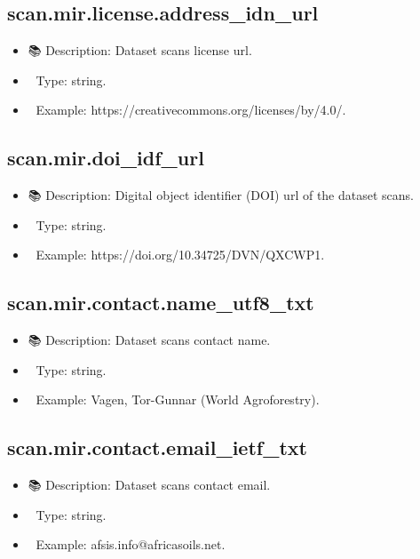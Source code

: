 \documentclass[
  letterpaper,
  DIV=11,
  numbers=noendperiod]{scrreprt}
\providecommand{\tightlist}{%
  \setlength{\itemsep}{0pt}\setlength{\parskip}{0pt}}\usepackage{longtable,booktabs,array}
\begin{document}
\subsection{scan.mir.license.address\_idn\_url}\label{scan.mir.license.address_idn_url}

\begin{itemize}
\tightlist
\item
  📚 Description: Dataset scans license url.
\item
  🔢 Type: string.
\item
  📖 Example: https://creativecommons.org/licenses/by/4.0/.
\end{itemize}

\subsection{scan.mir.doi\_idf\_url}\label{scan.mir.doi_idf_url}

\begin{itemize}
\tightlist
\item
  📚 Description: Digital object identifier (DOI) url of the dataset
  scans.
\item
  🔢 Type: string.
\item
  📖 Example: https://doi.org/10.34725/DVN/QXCWP1.
\end{itemize}

\subsection{scan.mir.contact.name\_utf8\_txt}\label{scan.mir.contact.name_utf8_txt}

\begin{itemize}
\tightlist
\item
  📚 Description: Dataset scans contact name.
\item
  🔢 Type: string.
\item
  📖 Example: Vagen, Tor-Gunnar (World Agroforestry).
\end{itemize}

\subsection{scan.mir.contact.email\_ietf\_txt}\label{scan.mir.contact.email_ietf_txt}

\begin{itemize}
\tightlist
\item
  📚 Description: Dataset scans contact email.
\item
  🔢 Type: string.
\item
  📖 Example: afsis.info@africasoils.net.
\end{itemize}
\end{document}
